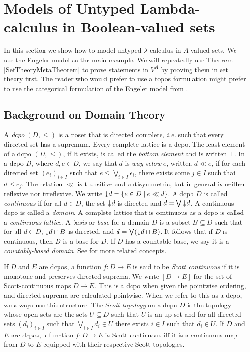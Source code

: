 \documentclass{lmcs}
\newcommand{\doubledownarrow}{\rotatebox[origin=c]{-90}{$\twoheadrightarrow$}}
\newcommand{\dd}{\doubledownarrow}
\newcommand{\scottcon}[2]{{[#1 \rightarrow #2]}}
\begin{document}

\section{Models of Untyped Lambda-calculus in Boolean-valued sets}
\label{ClassicalLambdaSection}
In this section we show how to model untyped $\lambda$-calculus in $A$-valued sets. We use the Engeler model \cite{engeler1981} as the main example. We will repeatedly use Theorem \ref{SetTheoryMetaTheorem} to prove statements in $V^A$ by proving them in set theory first. The reader who would prefer to use a topos formulation might prefer to use the categorical formulation of the Engeler model from \cite{hyland2006}. 

\subsection{Background on Domain Theory}
A \emph{dcpo} $(D,\leq)$ is a poset that is directed complete, \emph{i.e.} such that every directed set has a supremum. Every complete lattice is a dcpo. The least element of a dcpo $(D,\leq)$, if it exists, is called the \emph{bottom element} and is written $\bot$. %
In a dcpo $D$, where $d,e \in D$, we say that $d$ is \emph{way below} $e$, written $d \ll e$, if for each directed set $(e_i)_{i \in I}$ such that $e \leq \bigvee_{i \in I}e_i$, there exists some $j \in I$ such that $d \leq e_j$. The relation $\ll$ is transitive and antisymmetric, but in general is neither reflexive nor irreflexive.
We write $\dd d = \{ e \in D \mid e \ll d \}$. %
A dcpo $D$ is called \emph{continuous} if for all $d \in D$, the set $\dd d$ is directed and $d = \bigvee \dd d$. %
A continuous dcpo is called a \emph{domain}. A complete lattice that is continuous as a dcpo is called a \emph{continuous lattice}.
A \emph{basis} or \emph{base} for a domain $D$ is a subset $B \subseteq D$ such that for all $d \in D$, $\dd d \cap B$ is directed, and $d = \bigvee ( \dd d \cap B)$. It follows that if $D$ is continuous, then $D$ is a base for $D$. If $D$ has a countable base, we say it is a \emph{countably-based domain}. See \cite{gierz} for more related concepts.

If $D$ and $E$ are dcpos, a function $f : D \rightarrow E$ is said to be \emph{Scott continuous} if it is monotone and preserves directed suprema. We write $\scottcon{D}{E}$ for the set of Scott-continuous maps $D \rightarrow E$. This is a dcpo when given the pointwise ordering, and directed suprema are calculated pointwise. When we refer to this as a dcpo, we always use this structure. 
%
The \emph{Scott topology} on a dcpo $D$ is the topology whose open sets are the sets $U \subseteq D$ such that $U$ is an up set and for all directed sets $(d_i)_{i \in I}$ such that $\bigvee_{i \in I}d_i \in U$ there exists $i \in I$ such that $d_i \in U$. If $D$ and $E$ are dcpos, a function $f : D \rightarrow E$ is Scott continuous iff it is a continuous map from $D$ to $E$ equipped with their respective Scott topologies. 
\end{document}
